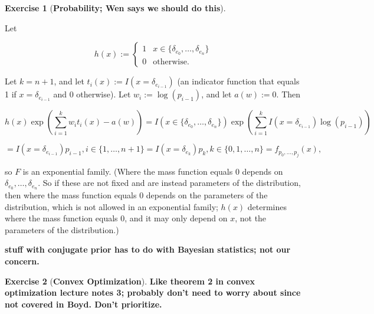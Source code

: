 \documentclass{article}
\theoremstyle{definition}
\newtheorem{exercise}{Exercise}
\theoremstyle{definition}
\theoremstyle{definition}
\theoremstyle{definition}
\begin{document}
\begin{exercise}[\textbf{Probability; Wen says we should do this}]
\begin{enumerate}[(a)]
Let

\[
h(x) := \begin{cases}
1 & x \in \{\delta_{e_0}, \ldots, \delta_{e_n}\} \\
0 & \text{otherwise.}
\end{cases}
\]

Let \(k = n+1\), and let \(t_i(x) := I(x = \delta_{e_{i-1}})\) (an indicator function that equals 1 if \(x =  \delta_{e_{i-1}}\) and 0 otherwise). Let \(w_i := \log(p_{i-1})\), and let \(a(w) := 0\). Then

\[
 h(x) \exp \left( \sum_{i=1}^k w_i t_i(x) - a(w) \right) =  I(x \in \{\delta_{e_0}, \ldots, \delta_{e_n}\}) \exp \left( \sum_{i=1}^k I(x = \delta_{e_{i-1}}) \log(p_{i-1})  \right)
 \]
 
 \[
  = I(x = \delta_{e_{i-1}}) p_{i-1}, i \in \{ 1, \ldots, n + 1\} =  I(x = \delta_{e_{k}}) p_{k}, k \in \{ 0, 1, \ldots, n\} = f_{p_0, \ldots, p_j} (x),
\] 

so \(F\) is an exponential family. (Where the mass function equals 0 depends on \(\delta_{e_0}, \ldots, \delta_{e_n}\). So if these are not fixed and are instead parameters of the distribution, then where the mass function equals 0 depends on the parameters of the distribution, which is not allowed in an exponential family; \(h(x)\) determines where the mass function equals 0, and it may only depend on \(x\), not the parameters of the distribution.)

\textbf{stuff with conjugate prior has to do with Bayesian statistics; not our concern.}

\end{enumerate}

\end{exercise}

\begin{exercise}[\textbf{Convex Optimization}]

\textbf{Like theorem 2 in convex optimization lecture notes 3; probably don't need to worry about since not covered in Boyd. Don't prioritize.}

\end{exercise}
\end{document}
